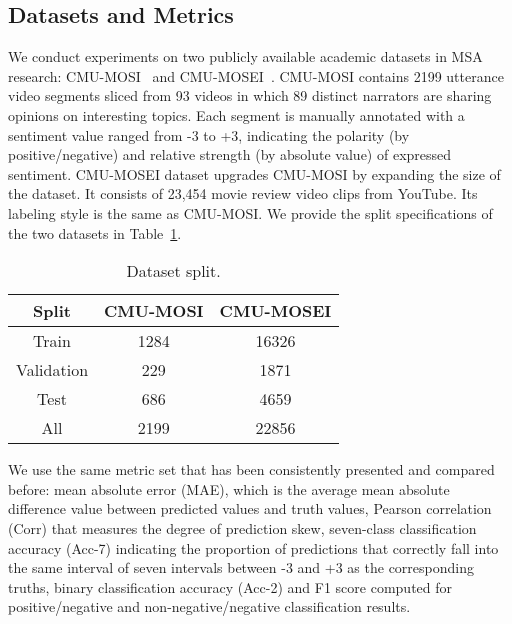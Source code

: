 \documentclass[11pt]{article}
\begin{document}
\subsection{Datasets and Metrics}
We conduct experiments on two publicly available academic datasets in MSA research:  CMU-MOSI~\citep{zadeh2016multimodal} and CMU-MOSEI~\citep{zadeh2018multimodal}. 
CMU-MOSI contains 2199 utterance video segments sliced from 93 videos in which 89 distinct narrators are sharing opinions on interesting topics.
Each segment is manually annotated with a sentiment value ranged from -3 to +3, indicating the polarity (by positive/negative) and relative strength (by absolute value) of expressed sentiment. 
CMU-MOSEI dataset upgrades CMU-MOSI by expanding the size of the dataset. 
It consists of 23,454 movie review video clips from YouTube. 
Its labeling style is the same as CMU-MOSI.
We provide the split specifications of the two datasets in Table~\ref{Dataset Specification}.
\begin{table}
    \centering
\begin{tabular}{ccc}
        \hline
        Split & CMU-MOSI & CMU-MOSEI \\
        \hline
         Train & 1284 & 16326 \\
         Validation & 229 & 1871 \\
         Test & 686 & 4659 \\
         \hdashline
         All & 2199 & 22856 \\
         \hline
    \end{tabular}
    \caption{Dataset split.}
    \label{Dataset Specification}
\end{table} \par
We use the same metric set that has been consistently presented and compared before: mean absolute error (MAE), which is the average mean absolute difference value between predicted values and truth values, Pearson correlation (Corr) that measures the degree of prediction skew, seven-class classification accuracy (Acc-7) indicating the proportion of predictions that correctly fall into the same interval of seven intervals between -3 and +3 as the corresponding truths, binary classification accuracy (Acc-2) and F1 score computed for positive/negative and non-negative/negative classification results.
\end{document}
